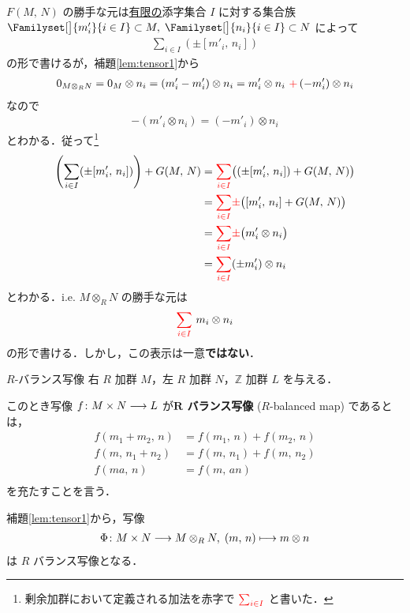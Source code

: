 \documentclass[algtopo_main]{subfiles}
\begin{document}
$F(M,\, N)$ の勝手な元は\underline{有限の}添字集合 $I$ に対する集合族 $\Familyset[\big]{m'_i}{i \in I} \subset M,\; \Familyset[\big]{n_i}{i \in I} \subset N$ によって
\begin{align}
	\sum_{i \in I} (\pm [m'_i,\, n_i])
\end{align}
の形で書けるが，補題\ref{lem:tensor1}から
\begin{align}
	0_{M \otimes_R N} = 0_M \otimes n_i = (m'_i - m'_i) \otimes n_i = m'_i \otimes n_i \mathop{}\textcolor{red}{+}\mathop{} (-m'_i) \otimes n_i
\end{align}
なので
\begin{align}
	- (m'_i \otimes n_i) = (-m'_i) \otimes n_i
\end{align}
とわかる．従って\footnote{剰余加群において定義される加法を赤字で $\textcolor{red}{\sum_{i \in I}}$ と書いた．}
\begin{align}
	\left( \sum_{i \in I} (\pm [m'_i,\, n_i]) \right) + G(M,\, N) 
	&= \textcolor{red}{\sum_{i \in I}} \bigl( (\pm [m'_i,\, n_i]) + G(M,\, N) \bigr) \\
	&= \textcolor{red}{\sum_{i \in I}}  \textcolor{red}{\pm} \bigl([m'_i,\, n_i] + G(M,\, N) \bigr) \\
	&= \textcolor{red}{\sum_{i \in I}} \textcolor{red}{\pm} \bigl(m'_i \otimes n_i \bigr) \\
	&= \textcolor{red}{\sum_{i \in I}}  (\pm m'_i) \otimes n_i
\end{align}
とわかる．i.e. $M \otimes_R N$ の勝手な元は
\begin{align}
	\textcolor{red}{\sum_{i \in I}}\mathop{} m_i \otimes n_i
\end{align}
の形で書ける．しかし，この表示は一意\textbf{ではない}．

\begin{mydef}[label=def:R-balance]{$R$-バランス写像}
	右 $R$ 加群 $M$，左 $R$ 加群 $N$，$\mathbb{Z}$ 加群 $L$ を与える．
	
	このとき写像 $f \colon M \times N \longrightarrow L$ が\textbf{$\bm{R}$ バランス写像} ($R$-balanced map) であるとは，
	\begin{align}
		f(m_1 + m_2,\, n) &= f(m_1,\, n) + f(m_2,\, n) \\
		f(m,\, n_1 + n_2) &= f(m,\, n_1) + f(m,\, n_2) \\
		f(ma,\, n) &= f(m,\, an)\\
	\end{align}
	を充たすことを言う．
\end{mydef}

補題\ref{lem:tensor1}から，写像
\begin{align}
	\Phi \colon M \times N \longrightarrow M \otimes_R N,\; (m,\, n) \longmapsto m \otimes n
\end{align}
は $R$ バランス写像となる．
\end{document}
